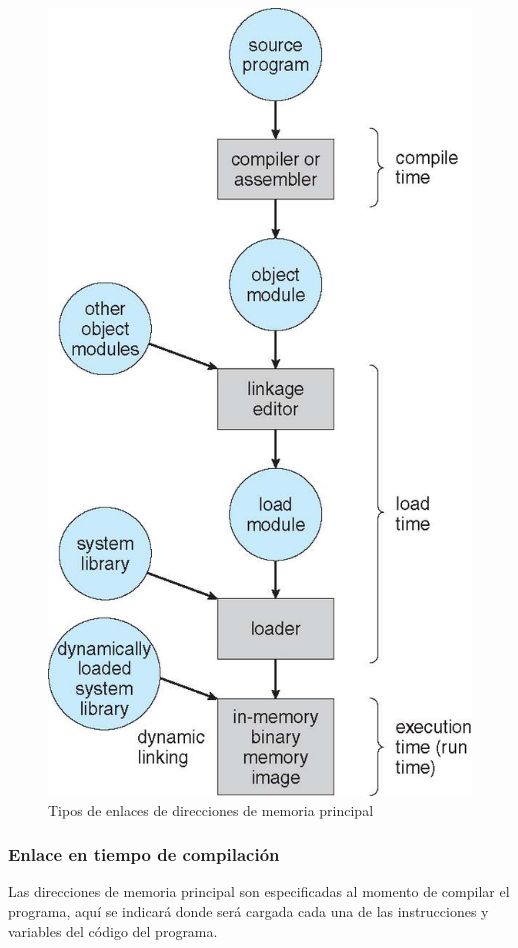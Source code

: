 \begin{figure}[htbp]
\centering
\includegraphics[scale=1]{img/C07_memoria/tipos_enlaces.jpg}
\caption{Tipos de enlaces de direcciones de memoria principal}
\label{fig:memoria_enlaces}
\end{figure}

\subsubsection{Enlace en tiempo de compilación}
Las direcciones de memoria principal son especificadas al momento de compilar el
programa, aquí se indicará donde será cargada cada una de las instrucciones y
variables del código del programa.

